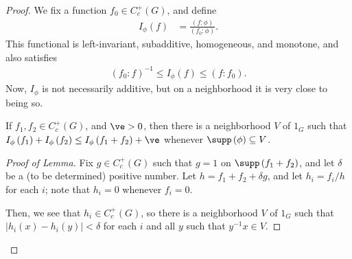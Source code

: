 \documentclass[10pt]{mypackage}
\begin{document}
\begin{proof}
  We fix a function $f_0\in C_c^{+}\left( G \right)$, and define
  \begin{align*}
    I_{\phi}\left( f \right) &= \frac{\left( f:\phi \right)}{\left( f_0:\phi \right)}.
  \end{align*}
  This functional is left-invariant, subadditive, homogeneous, and monotone, and also satisfies
  \begin{align*}
    \left( f_0:f \right)^{-1}\leq I_{\phi}\left( f \right)\leq \left( f:f_0 \right).
  \end{align*}
  Now, $I_{\phi}$ is not necessarily additive, but on a neighborhood it is very close to being so.
  \begin{lemma}
    If $f_1,f_2\in C_c^{+}\left( G \right)$, and $\ve > 0$, then there is a neighborhood $V$ of $1_G$ such that $I_{\phi}\left( f_1 \right) + I_{\phi}\left( f_2 \right) \leq I_{\phi}\left( f_1 + f_2 \right) + \ve$ whenever $\supp\left( \phi \right)\subseteq V$.
  \end{lemma}
  \begin{proof}[Proof of Lemma]
    Fix $g\in C_c^{+}\left( G \right)$ such that $g = 1$ on $\supp\left( f_1 + f_2 \right)$, and let $\delta$ be a (to be determined) positive number. Let $h = f_1 + f_2 + \delta g$, and let $h_i = f_i/h$ for each $i$; note that $h_i = 0$ whenever $f_i = 0$.\newline

    Then, we see that $h_i\in C_c^{+}\left( G \right)$, so there is a neighborhood $V$ of $1_G$ such that $\left\vert h_i\left( x \right) - h_i\left( y \right) \right\vert < \delta$ for each $i$ and all $y$ such that $y^{-1}x\in V$.\newline


\end{proof}
\end{proof}
\end{document}
